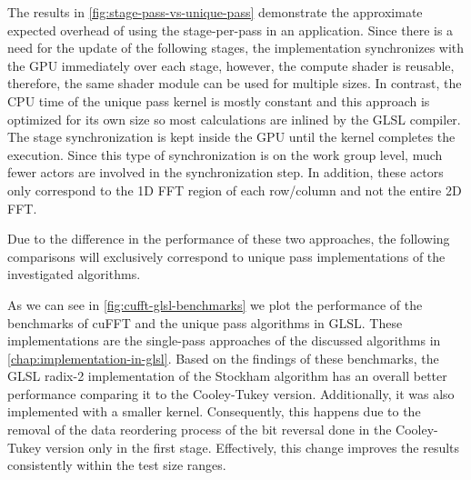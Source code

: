 \documentclass[
  oneside,
  11pt, a4paper,
  footinclude=true,
  headinclude=true,
  cleardoublepage=empty
]{scrbook}
\begin{document}


The results in \autoref{fig:stage-pass-vs-unique-pass} demonstrate the approximate expected overhead of using the stage-per-pass in an application. Since there is a need for the update of the following stages, the implementation synchronizes with the GPU immediately over each stage, however, the compute shader is reusable, therefore, the same shader module can be used for multiple sizes. In contrast, the CPU time of the unique pass kernel is mostly constant and this approach is optimized for its own size so most calculations are inlined by the GLSL compiler. The stage synchronization is kept inside the GPU until the kernel completes the execution. Since this type of synchronization is on the work group level, much fewer actors are involved in the synchronization step. In addition, these actors only correspond to the 1D FFT region of each row/column and not the entire 2D FFT.

Due to the difference in the performance of these two approaches, the following comparisons will exclusively correspond to unique pass implementations of the investigated algorithms.
\newline


As we can see in \autoref{fig:cufft-glsl-benchmarks} we plot the performance of the benchmarks of cuFFT and the unique pass algorithms in GLSL. These implementations are the single-pass approaches of the discussed algorithms in \autoref{chap:implementation-in-glsl}. Based on the findings of these benchmarks, the GLSL radix-2 implementation of the Stockham algorithm has an overall better performance comparing it to the Cooley-Tukey version. Additionally, it was also implemented with a smaller kernel. Consequently, this happens due to the removal of the data reordering process of the bit reversal done in the Cooley-Tukey version only in the first stage. Effectively, this change improves the results consistently within the test size ranges. %
\end{document}
